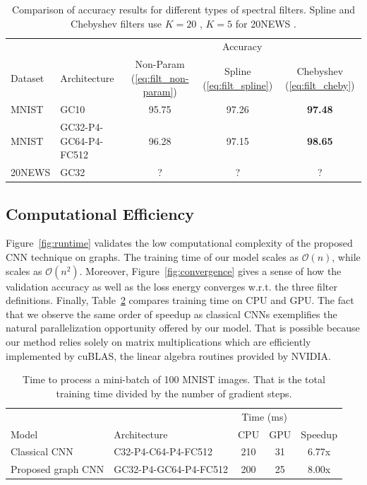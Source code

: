 \documentclass{article}
\newcommand{\bO}{\mathcal{O}}
\newcommand{\figref}[1]{Figure~\ref{fig:#1}}
\newcommand{\tabref}[1]{Table~\ref{tab:#1}}
\newcommand{\eqnref}[1]{(\ref{eq:#1})}
\newcommand{\bruna}{art:BrunaZarembaSzlamLeCun13DLgraphs,
art:HenaffBrunaLeCun15DLgraphs}
\newcommand{\todo}[1]{{\color{red} #1 }}
\begin{document}
\begin{table}[h!] \centering
\vspace{0.5cm}
\begin{tabular}{llccc} \toprule
& & \multicolumn{3}{c}{Accuracy} \\
\cmidrule{3-5}
Dataset & Architecture & Non-Param \eqnref{filt_non-param} &
Spline \eqnref{filt_spline} \cite{\bruna} &
Chebyshev \eqnref{filt_cheby} \\
\midrule
MNIST & GC10 & 95.75 & 97.26 & \textbf{97.48} \\
MNIST & GC32-P4-GC64-P4-FC512 & 96.28 & 97.15 & \textbf{98.65} \\
20NEWS & GC32 & \todo{?} & \todo{?} & \todo{?} \\
\bottomrule \end{tabular}
\caption{Comparison of accuracy results for different types of spectral filters.
Spline and Chebyshev filters use \todo{$K=20$}, \todo{$K=5$ for 20NEWS}.} 
\label{tab:filters}
\end{table}








\subsection{Computational Efficiency}


\figref{runtime} validates the low computational complexity of the proposed CNN technique on graphs. The training time of our model scales as $\bO(n)$, while \cite{\bruna} scales as $\bO(n^2)$. Moreover,
\figref{convergence} gives a sense of how the validation accuracy as well as the
loss energy converges w.r.t. the three filter definitions. Finally,
\tabref{speedup} compares training time on CPU and GPU. The fact that we observe
the same order of speedup as classical CNNs exemplifies the natural
parallelization opportunity offered by our model. That is possible because our
method relies solely on matrix multiplications which are efficiently implemented
by cuBLAS, the linear algebra routines provided by NVIDIA.

\begin{table}[h!] \centering
\vspace{0.5cm}
\begin{tabular}{llccc} \toprule
& & \multicolumn{2}{c}{Time (ms)} & \\
Model & Architecture & CPU & GPU & Speedup \\
\midrule
Classical CNN & C32-P4-C64-P4-FC512 & 210 & 31 & 6.77x \\
Proposed graph CNN & GC32-P4-GC64-P4-FC512 & 200 & 25 & 8.00x \\
\bottomrule \end{tabular}
\caption{Time to process a mini-batch of 100 MNIST images. That is the total
training time divided by the number of gradient steps.} 
\label{tab:speedup}
\end{table}
\end{document}

